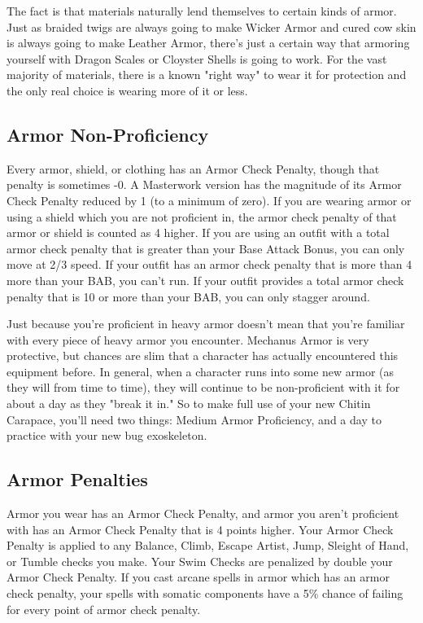 The fact is that materials naturally lend themselves to certain kinds of armor. Just as braided twigs are always going to make Wicker Armor and cured cow skin is always going to make Leather Armor, there's just a certain way that armoring yourself with Dragon Scales or Cloyster Shells is going to work. For the vast majority of materials, there is a known "right way" to wear it for protection and the only real choice is wearing more of it or less.

\subsection{Armor Non-Proficiency}

Every armor, shield, or clothing has an Armor Check Penalty, though that penalty is sometimes -0. A Masterwork version has the magnitude of its Armor Check Penalty reduced by 1 (to a minimum of zero). If you are wearing armor or using a shield which you are not proficient in, the armor check penalty of that armor or shield is counted as 4 higher. If you are using an outfit with a total armor check penalty that is greater than your Base Attack Bonus, you can only move at 2/3 speed. If your outfit has an armor check penalty that is more than 4 more than your BAB, you can't run. If your outfit provides a total armor check penalty that is 10 or more than your BAB, you can only stagger around.

Just because you're proficient in heavy armor doesn't mean that you're familiar with every piece of heavy armor you encounter. Mechanus Armor is very protective, but chances are slim that a character has actually encountered this equipment before. In general, when a character runs into some new armor (as they will from time to time), they will continue to be non-proficient with it for about a day as they "break it in." So to make full use of your new Chitin Carapace, you'll need two things: Medium Armor Proficiency, and a day to practice with your new bug exoskeleton.

\subsection{Armor Penalties}

Armor you wear has an Armor Check Penalty, and armor you aren't proficient with has an Armor Check Penalty that is 4 points higher. Your Armor Check Penalty is applied to any Balance, Climb, Escape Artist, Jump, Sleight of Hand, or Tumble checks you make. Your Swim Checks are penalized by double your Armor Check Penalty. If you cast arcane spells in armor which has an armor check penalty, your spells with somatic components have a 5\% chance of failing for every point of armor check penalty.

